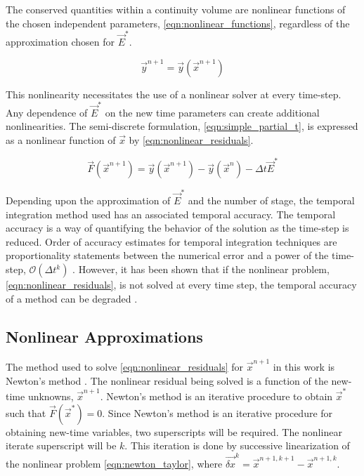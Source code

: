 The conserved quantities within a continuity volume are nonlinear functions of the chosen independent parameters, \eqref{eqn:nonlinear_functions}, regardless of the approximation chosen for $\vec{E}^{*}$.

\begin{equation}
\label{eqn:nonlinear_functions}
\vec{y}^{n+1} = \vec{y}(\vec{x}^{n+1})
\end{equation}

This nonlinearity necessitates the use of a nonlinear solver at every time-step.
Any dependence of $\vec{E}^{*}$ on the new time parameters can create additional nonlinearities.
The semi-discrete formulation, \eqref{eqn:simple_partial_t}, is expressed as a nonlinear function of $\vec{x}$ by \eqref{eqn:nonlinear_residuals}.

\begin{equation}
\label{eqn:nonlinear_residuals}
\vec{F}(\vec{x}^{n+1}) = \vec{y}(\vec{x}^{n+1}) - \vec{y}(\vec{x}^n) -\Delta t \vec{E}^{*}
\end{equation}

Depending upon the approximation of $\vec{E}^{*}$ and the number of stage, the temporal integration method used has an associated temporal accuracy.
The temporal accuracy is a way of quantifying the behavior of the solution as the time-step is reduced.
Order of accuracy estimates for temporal integration techniques are proportionality statements between the numerical error and a power of the time-step, $\mathcal{O}(\Delta t^k)$ \cite{LeVeque2007}. 
However, it has been shown that if the nonlinear problem, \eqref{eqn:nonlinear_residuals}, is not solved at every time step, the temporal accuracy of a method can be degraded \cite{Knoll2001, Mahaffy1993}.

\subsection{Nonlinear Approximations}
\label{subsect:nonlinear_approximations}

The method used to solve \eqref{eqn:nonlinear_residuals} for $\vec{x}^{n+1}$ in this work is Newton's method \cite{Deuflhard2004, Dennis1996}.
The nonlinear residual being solved is a function of the new-time unknowns, $\vec{x}^{n+1}$.
Newton's method is an iterative procedure to obtain $\vec{x}^{*}$ such that $\vec{F}(\vec{x}^{*}) = 0$.
Since Newton's method is an iterative procedure for obtaining new-time variables, two superscripts will be required.
The nonlinear iterate superscript will be $k$.
This iteration is done by successive linearization of the nonlinear problem \eqref{eqn:newton_taylor}, where $\vec{\delta x}^k = \vec{x}^{n+1,k+1} - \vec{x}^{n+1,k}$.

